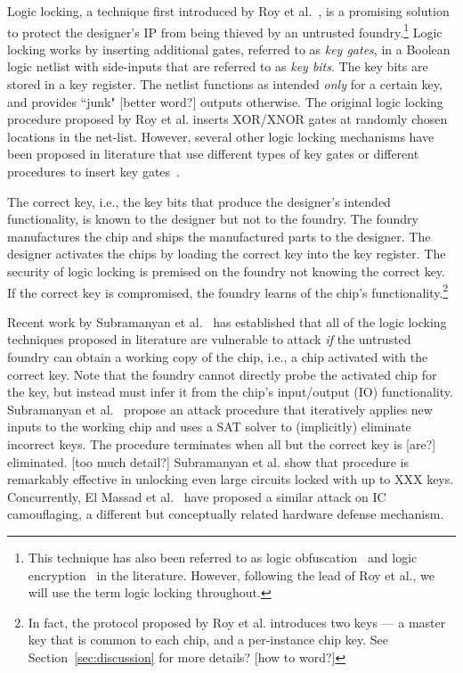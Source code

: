 Logic locking, a technique first introduced by Roy et al.~\cite{}, 
is a promising solution to protect the designer's IP from 
being thieved by an untrusted foundry.\footnote{This technique has 
also been referred to as logic obfuscation~\cite{} and logic encryption~\cite{} in the literature. However, following the lead of Roy et al., we will use the term logic locking throughout.}  
Logic locking works by inserting 
additional gates, referred to as \emph{key gates}, 
in a Boolean 
logic netlist with 
side-inputs that are referred to as \emph{key bits}. The key bits 
are 
stored in a key register. 
The netlist functions as intended \emph{only} 
for a certain key, and provides ``junk" [better word?]
outputs otherwise. 
The original logic locking procedure proposed by Roy et al. 
inserts XOR/XNOR gates at randomly chosen locations in the 
net-list. However, several other logic locking mechanisms have been proposed in literature that use different types of key gates or 
different procedures to insert key gates~\cite{}. 

The correct key, i.e., 
the key bits that produce the designer's intended 
functionality, 
is known to the designer but not to the foundry. The foundry manufactures the chip and ships the manufactured parts to the 
designer. The designer activates the chips by loading the 
correct key into the key register. 
The security of logic locking 
is premised on the foundry not knowing the correct key.
If the correct key is compromised, the foundry learns of the 
chip's functionality.\footnote{In fact, the protocol proposed by Roy et al. introduces two keys --- a master key that is common to each chip, and a per-instance chip key. See Section~\ref{sec:discussion} for more details? [how to word?]} 

  
Recent work by Subramanyan et al.~\cite{} has 
established 
that all
of the logic locking techniques proposed in literature
are vulnerable to attack \emph{if} the 
untrusted foundry can obtain a 
working copy of the chip, i.e., 
a chip activated with the correct key. 
Note that the foundry cannot directly 
probe the activated chip for the key, but instead 
must infer it from 
the chip's input/output (IO) functionality.   
Subramanyan
et al.~\cite{} propose an attack procedure that 
iteratively applies new inputs to the working chip and 
uses a SAT solver to 
(implicitly) eliminate incorrect keys. 
The procedure terminates when 
all but the correct key is [are?] eliminated. 
[too much detail?]
Subramanyan et al. show that procedure is 
remarkably effective in unlocking even large circuits locked 
with up to XXX keys. Concurrently, El Massad et al.~\cite{} 
have proposed a similar attack on IC camouflaging, 
a different but conceptually related hardware 
defense mechanism.

